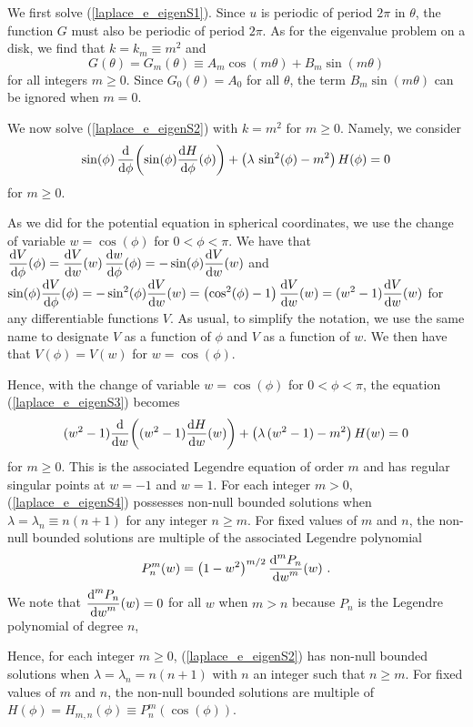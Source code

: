 We first solve (\ref{laplace_e_eigenS1}).  Since $u$ is periodic of period
$2\pi$ in $\theta$, the function $G$ must also be periodic of period
$2\pi$.  As for the eigenvalue problem on a disk, we find that
$k = k_m \equiv m^2$ and
\[
G(\theta) = G_m(\theta) \equiv A_m\cos(m\theta) + B_m\sin(m\theta)
\]
for all integers $m \geq 0$.  Since $G_0(\theta) = A_0$ for all
$\theta$, the term $B_m\sin(m\theta)$ can be ignored when $m=0$.

We now solve (\ref{laplace_e_eigenS2}) with $k=m^2$ for $m\geq 0$.
Namely, we consider
\begin{equation} \label{laplace_e_eigenS3}
\sin(\phi)\,\dfdx{\left(\sin(\phi)\dydx{H}{\phi}(\phi)\right)}{\phi}
+\left(\lambda\,\sin^2(\phi) - m^2\right)H(\phi) = 0
\end{equation}
for $m\geq 0$.

As we did for the potential equation in spherical
coordinates, we use the change of variable $w = \cos(\phi)$ for
$0<\phi<\pi$.
We have that
$\displaystyle \dydx{V}{\phi}(\phi) = \dydx{V}{w}(w)\, \dydx{w}{\phi}(\phi)
= -\sin(\phi) \dydx{V}{w}(w)$ and
$\displaystyle \sin(\phi) \dydx{V}{\phi}(\phi) = - \sin^2(\phi) \dydx{V}{w}(w)
= \left( \cos^2(\phi) - 1 \right) \dydx{V}{w}(w)
= (w^2-1)  \dydx{V}{w}(w)$
for any differentiable functions $V$.  As usual, to simplify the
notation, we use the same name to designate $V$ as a function of
$\phi$ and $V$ as a function of $w$.  We then have that $V(\phi) =
V(w)$ for $w=\cos(\phi)$.

Hence, with the change of variable $w = \cos(\phi)$ for $0<\phi<\pi$,
the equation (\ref{laplace_e_eigenS3}) becomes
\begin{equation} \label{laplace_e_eigenS4}
(w^2-1) \dfdx{\left( (w^2-1) \dydx{H}{w}(w)\right)}{w} 
+ \left( \lambda\,(w^2-1) -m^2\right) H(w) = 0 
\end{equation}
for $m\geq 0$.
This is the associated Legendre equation of order $m$
and has regular singular points at $w=-1$ and $w=1$.  For each
integer $m>0$, (\ref{laplace_e_eigenS4}) possesses non-null
bounded solutions when $\lambda = \lambda_n \equiv n(n+1)$ for
any integer $n \geq m$.  For fixed values of $m$ and
$n$, the non-null bounded solutions are multiple of the associated
Legendre polynomial
\[
P_n^m(w) = \left( 1-w^2 \right)^{m/2} \dydxn{P_n}{w}{m}(w) \ .
\]
We note that $\displaystyle \dydxn{P_n}{w}{m}(w) =0$ for all $w$ when
$m>n$ because $P_n$ is the Legendre polynomial of degree $n$,

Hence, for each integer $m\geq 0$, (\ref{laplace_e_eigenS2}) has
non-null bounded solutions when
$\lambda = \lambda_n = n(n+1)$ with $n$ an integer such that
$n\geq m$.  For fixed values of $m$ and $n$, the non-null bounded
solutions are multiple of
$\displaystyle H(\phi) = H_{m,n}(\phi) \equiv P_n^m(\cos(\phi))$.

